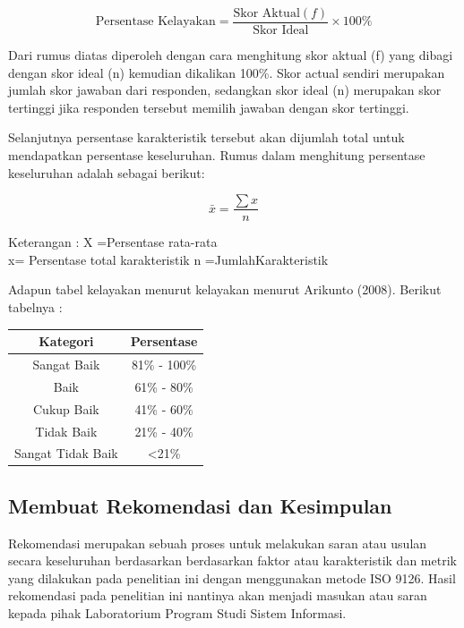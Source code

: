 \[
\text{Persentase Kelayakan} = \frac{\text{Skor Aktual}(f)}{\text{Skor Ideal}} \times 100\%
\]

Dari rumus diatas diperoleh dengan cara menghitung skor
aktual (f) yang dibagi dengan skor ideal (n) kemudian dikalikan 100\%. Skor actual sendiri merupakan jumlah skor jawaban dari responden, sedangkan skor ideal (n) merupakan skor tertinggi jika responden tersebut memilih jawaban dengan skor tertinggi.

Selanjutnya persentase karakteristik tersebut akan dijumlah total untuk mendapatkan persentase keseluruhan. Rumus dalam menghitung persentase keseluruhan adalah sebagai berikut:

\[
\bar{x} = \frac{\sum x}{n}
\]

Keterangan :
X =Persentase rata-rata \\
x= Persentase total karakteristik
n =JumlahKarakteristik

Adapun tabel kelayakan menurut kelayakan menurut Arikunto (2008). Berikut tabelnya :

\begin{table}[h!]
	\centering
	\begin{tabular}{cc}
	\hline
	\textbf{Kategori}        & \textbf{Persentase} \\ \hline
	Sangat Baik              & 81\% - 100\%        \\
	Baik                     & 61\% - 80\%         \\
	Cukup Baik               & 41\% - 60\%         \\
	Tidak Baik               & 21\% - 40\%         \\
	Sangat Tidak Baik        & \textless 21\%      \\ \hline
	\end{tabular}
	\end{table}
	
	
\subsection{Membuat Rekomendasi dan Kesimpulan}
Rekomendasi merupakan sebuah proses untuk melakukan saran atau usulan secara keseluruhan berdasarkan berdasarkan faktor atau karakteristik dan metrik yang dilakukan pada penelitian ini dengan menggunakan metode ISO 9126. Hasil rekomendasi pada penelitian ini nantinya akan menjadi masukan atau saran kepada pihak Laboratorium Program Studi Sistem Informasi.
